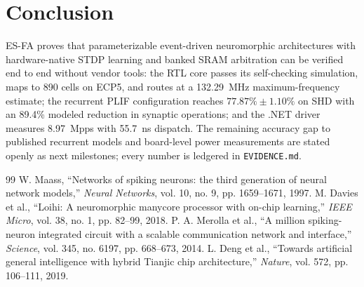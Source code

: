 \documentclass[journal]{IEEEtran}
\theoremstyle{definition}
\begin{document}
\section{Conclusion}
ES-FA proves that parameterizable event-driven neuromorphic architectures with hardware-native STDP learning and banked SRAM arbitration can be verified end to end without vendor tools: the RTL core passes its self-checking simulation, maps to 890 cells on ECP5, and routes at a 132.29~MHz maximum-frequency estimate; the recurrent PLIF configuration reaches $77.87\% \pm 1.10\%$ on SHD with an 89.4\% modeled reduction in synaptic operations; and the .NET driver measures 8.97~Mpps with 55.7~ns dispatch. The remaining accuracy gap to published recurrent models and board-level power measurements are stated openly as next milestones; every number is ledgered in \texttt{EVIDENCE.md}.


\begin{thebibliography}{99}
 W. Maass, ``Networks of spiking neurons: the third generation of neural network models,'' \emph{Neural Networks}, vol. 10, no. 9, pp. 1659--1671, 1997.
 M. Davies et al., ``Loihi: A neuromorphic manycore processor with on-chip learning,'' \emph{IEEE Micro}, vol. 38, no. 1, pp. 82--99, 2018.
 P. A. Merolla et al., ``A million spiking-neuron integrated circuit with a scalable communication network and interface,'' \emph{Science}, vol. 345, no. 6197, pp. 668--673, 2014.
 L. Deng et al., ``Towards artificial general intelligence with hybrid Tianjic chip architecture,'' \emph{Nature}, vol. 572, pp. 106--111, 2019.
\end{thebibliography}
\end{document}
